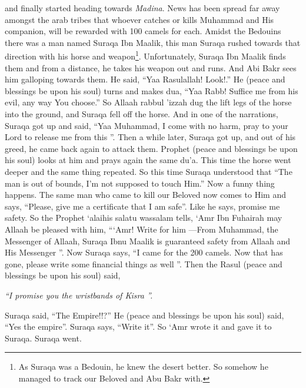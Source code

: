 {{}  and finally started heading towards \textit{Madina}. News has been spread far away amongst the arab tribes that whoever catches or kills Muhammad and His companion, will be rewarded with 100 camels for each. Amidst the Bedouins there was a man named Suraqa Ibn Maalik, this man Suraqa rushed towards that direction with his horse and weapon\footnote{ As Suraqa was a Bedouin, he knew the desert better. So somehow he managed to track our Beloved and Abu Bakr with.}. Unfortunately, Suraqa Ibn Maalik finds them and from a distance, he takes his weapon out and runs. And Abi Bakr sees him galloping towards them. He said, “Yaa Rasulallah! Look!.” He (peace and blessings be upon his soul) turns and makes dua, “Yaa Rabb! Suffice me from his evil, any way You choose.” So Allaah rabbul 'izzah dug the lift legs of the horse into the ground, and Suraqa fell off the horse. And in one of the narrations, Suraqa got up and said, “Yaa Muhammad, I come with no harm, pray to your Lord to release me from this ”. Then a while later, Suraqa got up, and out of his greed, he came back again to attack them. Prophet (peace and blessings be upon his soul) looks at him and prays again the same du’a. This time the horse went deeper and the same thing repeated. So this time Suraqa understood that ``The man is out of bounds, I’m not supposed to touch Him.'' Now a funny thing happens. The same man who came to kill our Beloved now comes to Him and says, “Please, give me a certificate that I am safe”. Like he says, promise me safety. So the Prophet ‘alaihis salatu wassalam tells, ‘Amr Ibn Fuhairah may Allaah be pleased with him, “‘Amr! Write for him ---From Muhammad, the Messenger of Allaah, Suraqa Ibnu Maalik is guaranteed safety from Allaah and His Messenger ”. Now Suraqa says, “I came for the 200 camels. Now that has gone, please write some financial things as well ”. Then the Rasul (peace and blessings be upon his soul) said, 
\begin{center}
    \textit{“I promise you the wristbands of Kisra ”.}
\end{center}
Suraqa said, “The Empire!!?” He (peace and blessings be upon his soul) said, “Yes the empire”. Suraqa says, “Write it”. So ‘Amr wrote it and gave it to Suraqa. Suraqa went.

}
